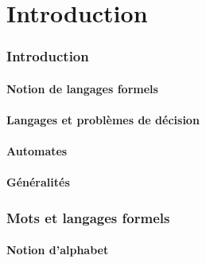 
\begingroup

\part{Introduction}
 
 
\section{Introduction}
 
\subsection{Notion de langages formels}




 
\subsection{Langages et problèmes de décision}




 
\subsection{Automates}


 
\subsection{Généralités} 


 
 
 
\section{Mots et langages formels}
 
\subsection{Notion d'alphabet}

 
